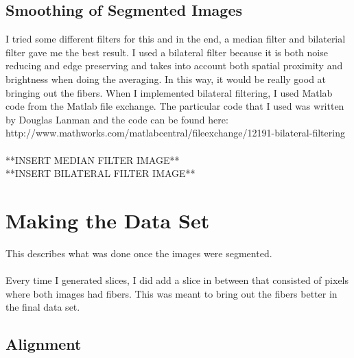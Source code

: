 \documentclass[11pt,psfig]{article}
\begin{document}
\subsection*{Smoothing of Segmented Images}

I tried some different filters for this and in the end, a median filter and bilaterial filter gave me the best result. I used a bilateral filter because it is both noise reducing and edge preserving and takes into account both spatial proximity and brightness when doing the averaging. In this way, it would be really good at bringing out the fibers. When I implemented bilateral filtering, I used Matlab code from the Matlab file exchange. The particular code that I used was written by Douglas Lanman and the code can be found here: http://www.mathworks.com/matlabcentral/fileexchange/12191-bilateral-filtering \\
\\
**INSERT MEDIAN FILTER IMAGE**
\\
**INSERT BILATERAL FILTER IMAGE**

\section*{Making the Data Set}

This describes what was done once the images were segmented. \\
\\
Every time I generated slices, I did add a slice in between that consisted of pixels where both images had fibers. This was meant to bring out the fibers better in the final data set. 

\subsection*{Alignment}
\end{document}
